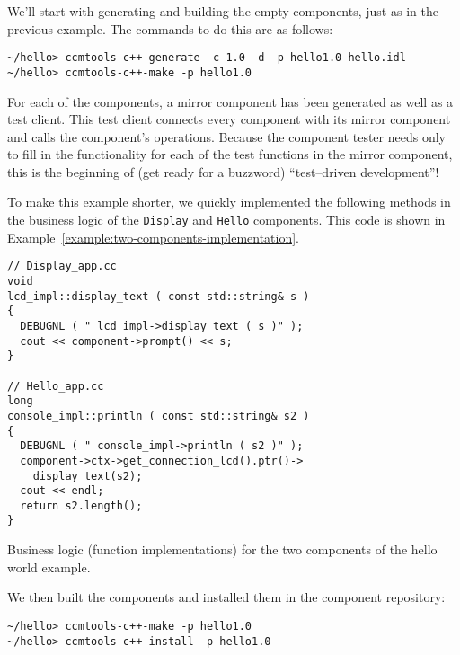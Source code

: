 We'll start with generating and building the empty components, just as in the
previous example. The commands to do this are as follows:
\begin{small}
\begin{verbatim}
~/hello> ccmtools-c++-generate -c 1.0 -d -p hello1.0 hello.idl
~/hello> ccmtools-c++-make -p hello1.0
\end{verbatim}
\end{small}

For each of the components, a mirror component has been generated as well as a
test client. This test client connects every component with its mirror component
and calls the component's operations. Because the component tester needs only to
fill in the functionality for each of the test functions in the mirror
component, this is the beginning of (get ready for a buzzword) ``test--driven
development''!

To make this example shorter, we quickly implemented the following methods in
the business logic of the {\tt Display} and {\tt Hello} components. This code is
shown in Example~\ref{example:two-components-implementation}.

\begin{Example}
\begin{minifbox}
\begin{small}
\begin{verbatim}
// Display_app.cc
void
lcd_impl::display_text ( const std::string& s )
{
  DEBUGNL ( " lcd_impl->display_text ( s )" );
  cout << component->prompt() << s;
}

// Hello_app.cc
long
console_impl::println ( const std::string& s2 )
{
  DEBUGNL ( " console_impl->println ( s2 )" );
  component->ctx->get_connection_lcd().ptr()->
    display_text(s2);
  cout << endl;
  return s2.length();
}
\end{verbatim}
\end{small}
\end{minifbox}
\caption{Business logic (function implementations) for the two components of the
hello world example.}
\label{example:two-components-implementation}
\end{Example}

We then built the components and installed them in the component repository:
\begin{small}
\begin{verbatim}
~/hello> ccmtools-c++-make -p hello1.0
~/hello> ccmtools-c++-install -p hello1.0
\end{verbatim}
\end{small}

